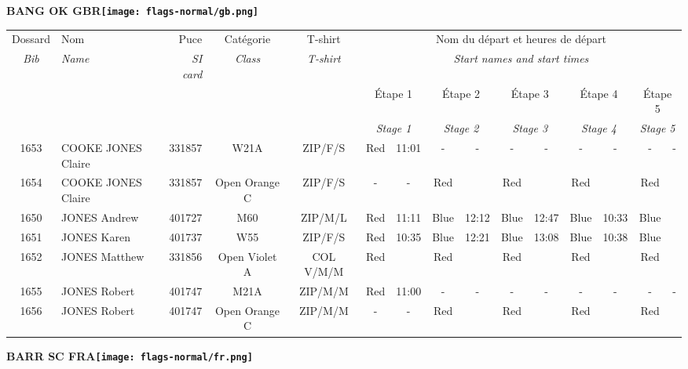 \documentclass{report}
\begin{document}
\newpage
  \Huge \centering \bfseries BANG OK  GBR\normalfont \footnotesize \sffamily \hfill \texttt{[image: flags-normal/gb.png]} \newline 
  \begin{longtable}{|c|l|r|c|c|*{5}{cc|}}
    Dossard & Nom  & Puce    & Catégorie & T-shirt & \multicolumn{10}{c|}{Nom du départ et heures de départ} \\
    \itshape Bib     & \itshape Name & \itshape SI card & \itshape Class  & \itshape  T-shirt  & \multicolumn{10}{c|}{\itshape Start names and start times} \\
    \hline
    & & & & & \multicolumn{2}{c|}{Étape 1} & \multicolumn{2}{c|}{Étape 2} & \multicolumn{2}{c|}{Étape 3} & \multicolumn{2}{c|}{Étape 4} & \multicolumn{2}{c|}{Étape 5} \\
    & & & & & \multicolumn{2}{c|}{\itshape Stage 1} & \multicolumn{2}{c|}{\itshape Stage 2} & \multicolumn{2}{c|}{\itshape Stage 3} & \multicolumn{2}{c|}{\itshape Stage 4} & \multicolumn{2}{c|}{\itshape Stage 5} \\
    \hline
    1653 & COOKE JONES Claire & 331857 & W21A & ZIP/F/S & Red & 11:01 & - &  - & - &  - & - &  - & - &  -\\
    1654 & COOKE JONES Claire & 331857 & Open Orange C & ZIP/F/S & - &  - & Red &   & Red &   & Red &   & Red &  \\
    1650 & JONES Andrew & 401727 & M60 & ZIP/M/L & Red & 11:11 & Blue & 12:12 & Blue & 12:47 & Blue & 10:33 & Blue &  \\
    1651 & JONES Karen & 401737 & W55 & ZIP/F/S & Red & 10:35 & Blue & 12:21 & Blue & 13:08 & Blue & 10:38 & Blue &  \\
    1652 & JONES Matthew & 331856 & Open Violet A & COL V/M/M & Red &   & Red &   & Red &   & Red &   & Red &  \\
    1655 & JONES Robert & 401747 & M21A & ZIP/M/M & Red & 11:00 & - &  - & - &  - & - &  - & - &  -\\
    1656 & JONES Robert & 401747 & Open Orange C & ZIP/M/M & - &  - & Red &   & Red &   & Red &   & Red &  \\
  \end{longtable}
\newpage
  \Huge \centering \bfseries BARR SC  FRA\normalfont \footnotesize \sffamily \hfill \texttt{[image: flags-normal/fr.png]} \newline 
\end{document}
